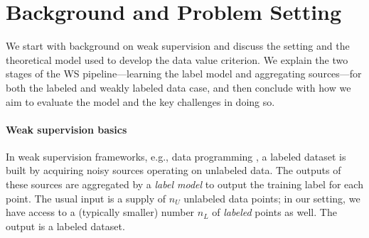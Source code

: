 \section{Background and Problem Setting} \label{sec:background}

We start with background on weak supervision and discuss the setting and the theoretical model used to develop the data value criterion. We explain the two stages of the WS pipeline---learning the label model and aggregating sources---for both the labeled and weakly labeled data case, and then conclude with how we aim to evaluate the model and the key challenges in doing so.




\paragraph{Weak supervision basics} In weak supervision frameworks, e.g., data programming \cite{mintz2009distant,Ratner16}, a labeled dataset is built by acquiring noisy sources operating on unlabeled data. The outputs of these sources %
are aggregated by a \emph{label model} to output the training label for each point. The usual input is a supply of $n_U$ unlabeled data points; in our setting, we have access to a (typically smaller) number $n_L$ of \emph{labeled} points as well. The output is a labeled dataset.

